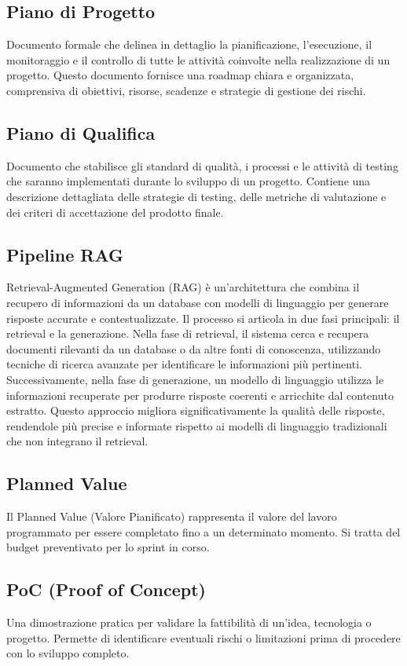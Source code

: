 \documentclass{article}
\begin{document}
\subsection{Piano di Progetto}
Documento formale che delinea in dettaglio la pianificazione, l'esecuzione, il monitoraggio e il controllo di tutte le attività coinvolte nella realizzazione di un progetto. Questo documento fornisce una roadmap chiara e organizzata, comprensiva di obiettivi, risorse, scadenze e strategie di gestione dei rischi.

\subsection{Piano di Qualifica}
Documento che stabilisce gli standard di qualità, i processi e le attività di testing che saranno implementati durante lo sviluppo di un progetto. Contiene una descrizione dettagliata delle strategie di testing, delle metriche di valutazione e dei criteri di accettazione del prodotto finale.

\subsection{Pipeline RAG}
Retrieval-Augmented Generation (RAG) è un'architettura che combina il recupero di informazioni da un database con modelli di linguaggio per generare risposte accurate e contestualizzate. Il processo si articola in due fasi principali: il retrieval e la generazione. Nella fase di retrieval, il sistema cerca e recupera documenti rilevanti da un database o da altre fonti di conoscenza, utilizzando tecniche di ricerca avanzate per identificare le informazioni più pertinenti. Successivamente, nella fase di generazione, un modello di linguaggio utilizza le informazioni recuperate per produrre risposte coerenti e arricchite dal contenuto estratto. Questo approccio migliora significativamente la qualità delle risposte, rendendole più precise e informate rispetto ai modelli di linguaggio tradizionali che non integrano il retrieval.

\subsection{Planned Value}
Il Planned Value (Valore Pianificato) rappresenta il valore del lavoro programmato per essere completato fino a un determinato momento. Si tratta del budget preventivato per lo sprint in corso.

\subsection{PoC (Proof of Concept)}
Una dimostrazione pratica per validare la fattibilità di un'idea, tecnologia o progetto. Permette di identificare eventuali rischi o limitazioni prima di procedere con lo sviluppo completo.
\end{document}
